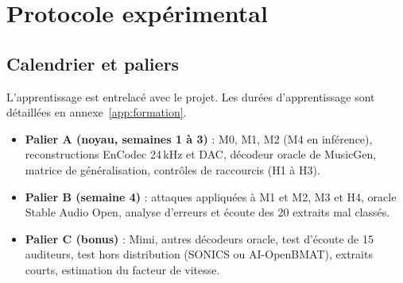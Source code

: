 \documentclass[11pt,a4paper]{article}
\begin{document}
\section{Protocole expérimental}
\label{sec:protocole}

\subsection{Calendrier et paliers}
\label{sec:calendrier}

L'apprentissage est entrelacé avec le projet. Les durées d'apprentissage sont détaillées en annexe~\ref{app:formation}.

\begin{itemize}
  \item \textbf{Palier A (noyau, semaines 1 à 3)} : M0, M1, M2 (M4 en inférence), reconstructions EnCodec 24\,kHz et DAC, décodeur oracle de MusicGen, matrice de généralisation, contrôles de raccourcis (H1 à H3).
  \item \textbf{Palier B (semaine 4)} : attaques appliquées à M1 et M2, M3 et H4, oracle Stable Audio Open, analyse d'erreurs et écoute des 20 extraits mal classés.
  \item \textbf{Palier C (bonus)} : Mimi, autres décodeurs oracle, test d'écoute de 15 auditeurs, test hors distribution (SONICS ou AI-OpenBMAT), extraits courts, estimation du facteur de vitesse.
\end{itemize}
\end{document}
